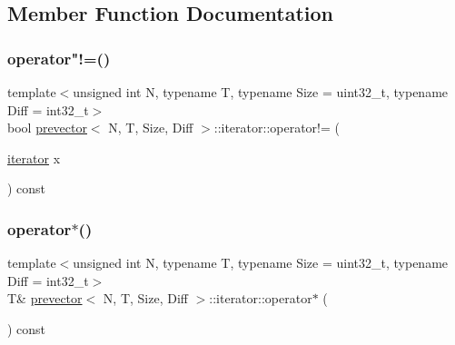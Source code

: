 \subsection{Member Function Documentation}
\mbox{\label{classprevector_1_1iterator_a4a5eb32aaaf5aba9b5cfca4557e02976}} 
\subsubsection{\texorpdfstring{operator"!=()}{operator!=()}}
{\footnotesize\ttfamily template$<$unsigned int N, typename T, typename Size = uint32\+\_\+t, typename Diff = int32\+\_\+t$>$ \\
bool \mbox{\hyperlink{classprevector}{prevector}}$<$ N, T, Size, Diff $>$\+::iterator\+::operator!= (\begin{DoxyParamCaption}\item[{\mbox{\hyperlink{classprevector_1_1iterator}{iterator}}}]{x }\end{DoxyParamCaption}) const\hspace{0.3cm}{\ttfamily [inline]}}

\mbox{\label{classprevector_1_1iterator_a7f81fb12a0dd106f93629367cdd1be39}} 
\subsubsection{\texorpdfstring{operator$\ast$()}{operator*()}}
{\footnotesize\ttfamily template$<$unsigned int N, typename T, typename Size = uint32\+\_\+t, typename Diff = int32\+\_\+t$>$ \\
T\& \mbox{\hyperlink{classprevector}{prevector}}$<$ N, T, Size, Diff $>$\+::iterator\+::operator$\ast$ (\begin{DoxyParamCaption}{ }\end{DoxyParamCaption}) const\hspace{0.3cm}{\ttfamily [inline]}}

\mbox{\label{classprevector_1_1iterator_ad7b3c04ffe920172bebb072d91f9f899}} 
